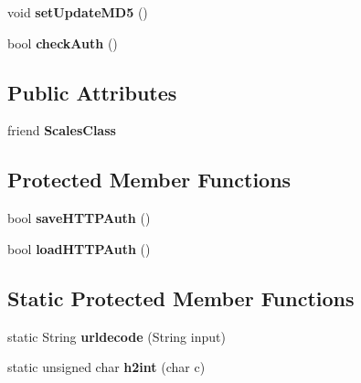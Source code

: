 \begin{DoxyCompactItemize}
\item 
\hypertarget{class_browser_server_class_a7b6e9a8c9b5036420d105ddc06dd374e}{void {\bfseries set\-Update\-M\-D5} ()}\label{class_browser_server_class_a7b6e9a8c9b5036420d105ddc06dd374e}

\item 
\hypertarget{class_browser_server_class_ac11e655ebfa50fd043d9019349974b76}{bool {\bfseries check\-Auth} ()}\label{class_browser_server_class_ac11e655ebfa50fd043d9019349974b76}

\end{DoxyCompactItemize}
\subsection*{Public Attributes}
\begin{DoxyCompactItemize}
\item 
\hypertarget{class_browser_server_class_a09e7cc94904b6c2ee3a592264156f23e}{friend {\bfseries Scales\-Class}}\label{class_browser_server_class_a09e7cc94904b6c2ee3a592264156f23e}

\end{DoxyCompactItemize}
\subsection*{Protected Member Functions}
\begin{DoxyCompactItemize}
\item 
\hypertarget{class_browser_server_class_a375f9dbe3468cf92215881929f64c11c}{bool {\bfseries save\-H\-T\-T\-P\-Auth} ()}\label{class_browser_server_class_a375f9dbe3468cf92215881929f64c11c}

\item 
\hypertarget{class_browser_server_class_ab16179c7f81ddb489417842c1b68cdc8}{bool {\bfseries load\-H\-T\-T\-P\-Auth} ()}\label{class_browser_server_class_ab16179c7f81ddb489417842c1b68cdc8}

\end{DoxyCompactItemize}
\subsection*{Static Protected Member Functions}
\begin{DoxyCompactItemize}
\item 
\hypertarget{class_browser_server_class_af65d5136674d1a23a18acfb4b7ecfe3e}{static String {\bfseries urldecode} (String input)}\label{class_browser_server_class_af65d5136674d1a23a18acfb4b7ecfe3e}

\item 
\hypertarget{class_browser_server_class_ae389eb2944eebfbf2ef5ada82906ad3b}{static unsigned char {\bfseries h2int} (char c)}\label{class_browser_server_class_ae389eb2944eebfbf2ef5ada82906ad3b}

\end{DoxyCompactItemize}

